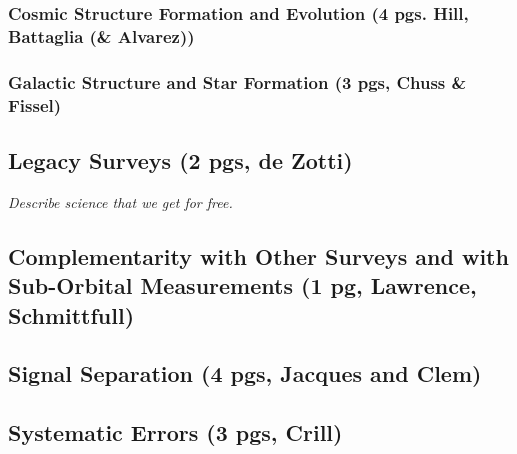 \documentclass[12pt]{article}
\begin{document}
\vspace{-0.05in}




\subsubsection{Cosmic Structure Formation and Evolution (4 pgs. Hill, Battaglia (\& Alvarez))}




\subsubsection{Galactic Structure and Star Formation (3 pgs, Chuss \& Fissel)}




\subsection{Legacy Surveys (2 pgs, de Zotti)} 

{\it Describe science that we get for free. }




\subsection{Complementarity with Other Surveys and with Sub-Orbital Measurements (1 pg, Lawrence, Schmittfull)} 




\subsection{Signal Separation (4 pgs, Jacques and Clem)}




\subsection{Systematic Errors (3 pgs, Crill)}


\end{document}
